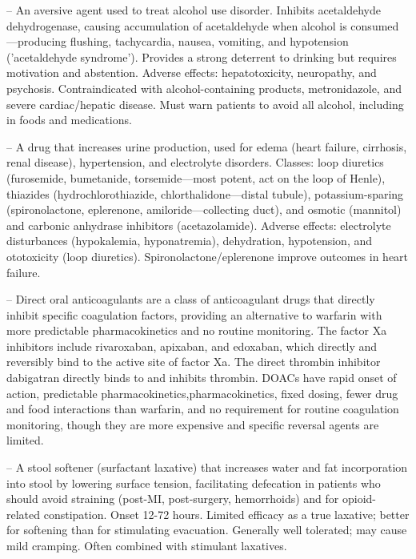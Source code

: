 -- An aversive agent used to treat alcohol use disorder. Inhibits acetaldehyde dehydrogenase, causing accumulation of acetaldehyde when alcohol is consumed—producing flushing, tachycardia, nausea, vomiting, and hypotension ('acetaldehyde syndrome'). Provides a strong deterrent to drinking but requires motivation and abstention. Adverse effects: hepatotoxicity, neuropathy, and psychosis. Contraindicated with alcohol-containing products, metronidazole, and severe cardiac/hepatic disease. Must warn patients to avoid all alcohol, including in foods and medications.

-- A drug that increases urine production, used for edema (heart failure, cirrhosis, renal disease), hypertension, and electrolyte disorders. Classes: loop diuretics (furosemide, bumetanide, torsemide—most potent, act on the loop of Henle), thiazides (hydrochlorothiazide, chlorthalidone—distal tubule), potassium-sparing (spironolactone, eplerenone, amiloride—collecting duct), and osmotic (mannitol) and carbonic anhydrase inhibitors (acetazolamide). Adverse effects: electrolyte disturbances (hypokalemia, hyponatremia), dehydration, hypotension, and ototoxicity (loop diuretics). Spironolactone/eplerenone improve outcomes in heart failure.

-- Direct oral anticoagulants are a class of anticoagulant drugs that directly inhibit specific coagulation factors, providing an alternative to warfarin with more predictable pharmacokinetics and no routine monitoring. The factor Xa inhibitors include rivaroxaban, apixaban, and edoxaban, which directly and reversibly bind to the active site of factor Xa. The direct thrombin inhibitor dabigatran directly binds to and inhibits thrombin. DOACs have rapid onset of action, predictable pharmacokinetics,pharmacokinetics, fixed dosing, fewer drug and food interactions than warfarin, and no requirement for routine coagulation monitoring, though they are more expensive and specific reversal agents are limited.

-- A stool softener (surfactant laxative) that increases water and fat incorporation into stool by lowering surface tension, facilitating defecation in patients who should avoid straining (post-MI, post-surgery, hemorrhoids) and for opioid-related constipation. Onset 12-72 hours. Limited efficacy as a true laxative; better for softening than for stimulating evacuation. Generally well tolerated; may cause mild cramping. Often combined with stimulant laxatives.

